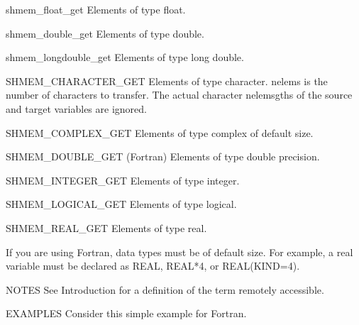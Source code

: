        shmem_float_get		     Elements of type float.

       shmem_double_get		     Elements of type double.

       shmem_longdouble_get	     Elements of type long double.

       SHMEM_CHARACTER_GET	     Elements of type character.  nelems  is  the
				     number  of	 characters  to transfer.  The
				     actual character nelemsgths  of  the	source
				     and target variables are ignored.

       SHMEM_COMPLEX_GET	     Elements of type complex of default size.

       SHMEM_DOUBLE_GET (Fortran)    Elements of type double precision.

       SHMEM_INTEGER_GET	     Elements of type integer.

       SHMEM_LOGICAL_GET	     Elements of type logical.

       SHMEM_REAL_GET		     Elements of type real.

       If you are using Fortran, data types must  be  of  default  size.   For
       example,	 a  real  variable  must  be  declared	as  REAL,  REAL*4,  or
       REAL(KIND=4).

NOTES
       See Introduction for a definition of the term remotely accessible.

EXAMPLES
       Consider this simple example for Fortran.

	 
